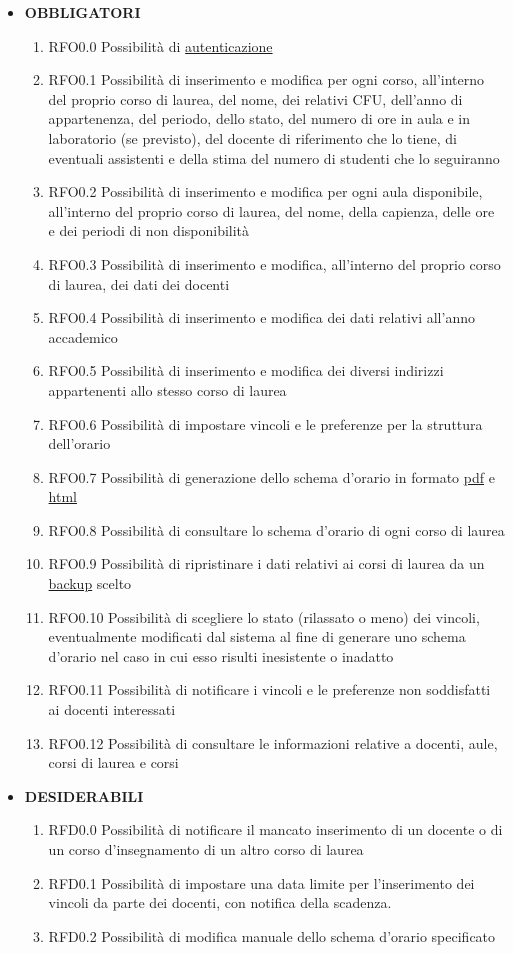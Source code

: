 \documentclass[11pt,a4paper]{article}
\begin{document}
\begin{itemize}
\item \textbf{OBBLIGATORI}
\begin{enumerate}
\item RFO0.0 Possibilità di \underline{autenticazione}
\item RFO0.1 Possibilità di inserimento e modifica per ogni corso, all'interno del proprio corso di laurea, del nome, dei relativi CFU, dell'anno di appartenenza, del periodo, dello stato, del numero di ore in aula e in laboratorio (se previsto), del docente di riferimento che lo tiene, di eventuali assistenti e della stima del numero di studenti che lo seguiranno 
\item RFO0.2 Possibilità di inserimento e modifica per ogni aula disponibile, all'interno del proprio corso di laurea, del nome, della capienza, delle ore e dei periodi di non disponibilità
\item RFO0.3 Possibilità di inserimento e modifica, all'interno del proprio corso di laurea, dei dati dei docenti
\item RFO0.4 Possibilità di inserimento e modifica dei dati relativi all'anno accademico
\item RFO0.5 Possibilità di inserimento e modifica dei diversi indirizzi appartenenti allo stesso corso di laurea
\item RFO0.6 Possibilità di impostare vincoli e le preferenze per la struttura dell'orario
\item RFO0.7 Possibilità di generazione dello schema d'orario in formato \underline{pdf} e \underline{html}
\item RFO0.8 Possibilità di consultare lo schema d'orario di ogni corso di laurea
\item RFO0.9 Possibilità di ripristinare i dati relativi ai corsi di laurea da un \underline{backup} scelto
\item RFO0.10 Possibilità di scegliere lo stato (rilassato o meno) dei vincoli, eventualmente modificati dal sistema al fine di generare uno schema d'orario nel caso in cui esso risulti inesistente o inadatto
\item RFO0.11 Possibilità di notificare i vincoli e le preferenze non soddisfatti ai docenti interessati
\item RFO0.12 Possibilità di consultare le informazioni relative a docenti, aule, corsi di laurea e corsi
\end{enumerate}
\item \textbf{DESIDERABILI}
\begin{enumerate}
\item RFD0.0 Possibilità di notificare il mancato inserimento di un docente o di un corso d'insegnamento di un altro corso di laurea
\item RFD0.1 Possibilità di impostare una data limite per l'inserimento dei vincoli da parte dei docenti, con notifica della scadenza. 
\item RFD0.2 Possibilità di modifica manuale dello schema d'orario specificato
\end{enumerate}
\end{itemize}
\end{document}
